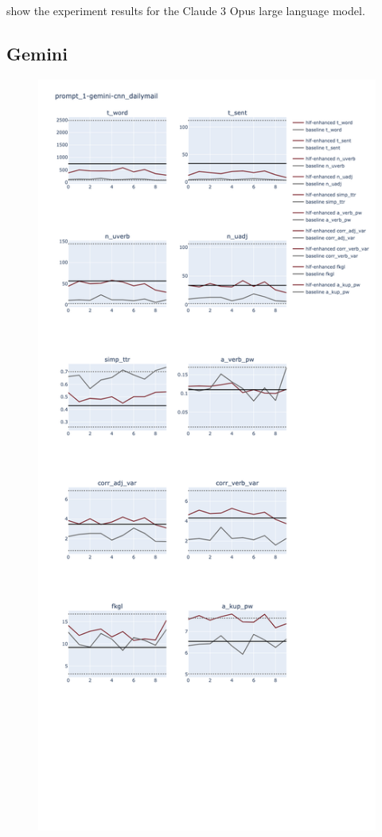 \documentclass[11pt]{article}
\begin{document}
show the experiment results for the Claude 3 Opus large language model.

\subsection{Gemini}

\begin{figure}[ht]
    \includegraphics[width=\textwidth,height=0.9\textheight,scale=1]{plots/prompt_1/prompt_1-gemini-cnn_dailymail/prompt_1-gemini-cnn_dailymail.png}

\end{figure}
\end{document}
